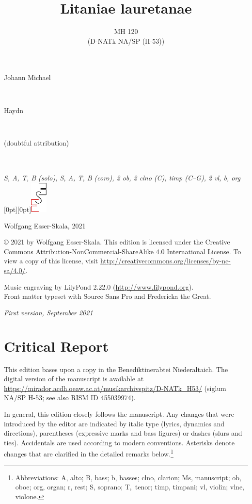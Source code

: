 \documentclass[parskip=full]{scrreprt}
\makeatletter
\DeclareRobustCommand{\sbseries}{\fontseries{sb}\selectfont}
\newcommand\fancytitlehead{
  \headingfont%
  \fontsize{80}{80}\selectfont%
  \textcolor{black!80}{%
    \makebox[0pt][l]{\@ifundefined{@shortname}{\@lastname}{\@shortname}.}%
  }\\[15pt]%
  \fontsize{60}{60}\selectfont%
  \makebox[0pt][l]{\@ifundefined{@shorttitle}{\@title}{\@shorttitle}.}%
}
\def\firstname#1{\def\@firstname{#1}}
\def\lastname#1{\def\@lastname{#1}}
\def\shortname#1{\def\@shortname{#1}}
\def\shorttitle#1{\def\@shorttitle{#1}}
\def\namesuffix#1{\def\@namesuffix{#1}}
\def\scoring#1{\def\@scoring{#1}}
\def\maketitle{%
\begin{titlepage}%
  \Large%
  {\@titlehead}%
  \vfill%
  {\strut\@firstname}\\%
  {\sbseries\color{oldred}\strut\@lastname}\\%
  {\strut\@namesuffix}%
  \vfill%
  {\sbseries\@title}\\%
  {\@subtitle}\\[\baselineskip]%
  {\itshape\@scoring}%
  \vfill%
  {\itshape\@parts}\hspace*{\fill}\raisebox{0pt}[0pt][0pt]{\includegraphics{ees_logo}}%
\end{titlepage}%
}
\newif\ifprintreport\printreportfalse
\makeatother
\begin{document}
\frenchspacing

\titlehead{\fancytitlehead}
\firstname{Johann Michael}
\lastname{Haydn}
\namesuffix{(doubtful attribution)}
\shortname{M. Haydn}
\title{Litaniae lauretanae}
\shorttitle{Lit. lauretanae}
\subtitle{MH 120\\(D-NATk NA/SP (H-53))}
\scoring{S, A, T, B (solo), S, A, T, B (coro), 2 ob, 2 clno (C), timp (C–G), 2 vl, b, org}
\maketitle


\thispagestyle{empty}

\vspace*{\fill}

\hspace*{1em}Wolfgang Esser-Skala, 2021

© 2021 by Wolfgang Esser-Skala. This edition is licensed under the Creative Commons Attribution-NonCommercial-ShareAlike 4.0 International License. To view a copy of this license, visit \url{http://creativecommons.org/licenses/by-nc-sa/4.0/}.

Music engraving by LilyPond 2.22.0 (\url{http://www.lilypond.org}).\\
Front matter typeset with Source Sans Pro and Fredericka the Great.

\textit{First version, September 2021}

\vspace*{2cm}

\ifprintreport
\chapter*{Critical Report}

This edition bases upon a copy in the Benediktinerabtei Niederaltaich. The digital version of the manuscript is available at \url{https://mirador.acdh.oeaw.ac.at/musikarchivspitz/D-NATk_H53/} (siglum NA/SP H-53; see also RISM ID 455039974).

In general, this edition closely follows the manuscript. Any changes that were introduced by the editor are indicated by italic type (lyrics, dynamics and directions), parentheses (expressive marks and bass figures) or dashes (slurs and ties). Accidentals are used according to modern conventions. Asterisks denote changes that are clarified in the detailed remarks below.\footnote{Abbreviations: A, alto; B, bass; b, basses; clno, clarion; Ms, manuscript; ob, oboe; org, organ; r, rest; S, soprano; T,~tenor; timp, timpani; vl, violin; vlne, violone.}
\end{document}
